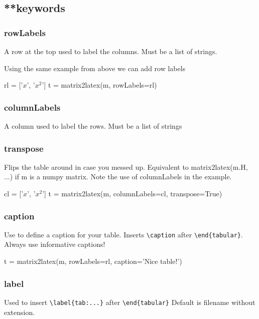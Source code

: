 \subsection{**keywords}
\subsubsection{rowLabels}
    A row at the top used to label the columns.
    Must be a list of strings.

Using the same example from above we can add row labels
\begin{sageblock}
rl = ['$x$', '$x^2$']
t = matrix2latex(m, rowLabels=rl)
\end{sageblock}

\subsubsection{columnLabels}
    A column used to label the rows.
    Must be a list of strings

\subsubsection{transpose}
Flips the table around in case you messed up. Equivalent to
matrix2latex(m.H, ...)
if m is a numpy matrix.
Note the use of columnLabels in the example.
\begin{sageblock}
cl = ['$x$', '$x^2$']
t = matrix2latex(m, columnLabels=cl, transpose=True)
\end{sageblock}

\subsubsection{caption}
    Use to define a caption for your table.
    Inserts \verb!\caption! after \verb!\end{tabular}!.
Always use informative captions!
\begin{sageblock}
t = matrix2latex(m, rowLabels=rl, 
                 caption='Nice table!')
\end{sageblock}

\subsubsection{label}
Used to insert \verb!\label{tab:...}! after \verb!\end{tabular}!
Default is filename without extension.

